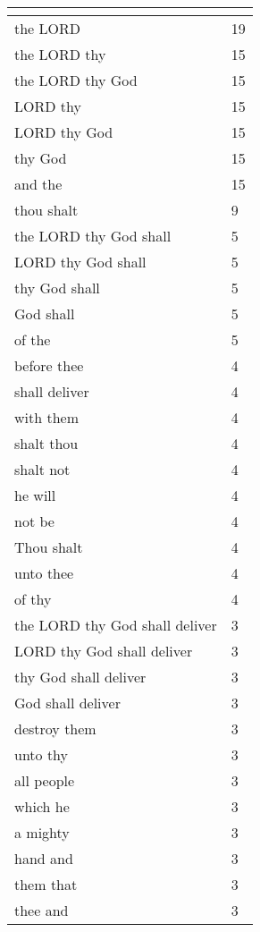 \begin{center}
\begin{longtable}{|p{3.0in}|p{0.5in}|}
\hline \multicolumn{2}{c}{{ }} \\ \hline
\endfoot 
the LORD & 19\\ \hline 
the LORD thy & 15\\ \hline 
the LORD thy God & 15\\ \hline 
LORD thy & 15\\ \hline 
LORD thy God & 15\\ \hline 
thy God & 15\\ \hline 
and the & 15\\ \hline 
thou shalt & 9\\ \hline 
the LORD thy God shall & 5\\ \hline 
LORD thy God shall & 5\\ \hline 
thy God shall & 5\\ \hline 
God shall & 5\\ \hline 
of the & 5\\ \hline 
before thee & 4\\ \hline 
shall deliver & 4\\ \hline 
with them & 4\\ \hline 
shalt thou & 4\\ \hline 
shalt not & 4\\ \hline 
he will & 4\\ \hline 
not be & 4\\ \hline 
Thou shalt & 4\\ \hline 
unto thee & 4\\ \hline 
of thy & 4\\ \hline 
the LORD thy God shall deliver & 3\\ \hline 
LORD thy God shall deliver & 3\\ \hline 
thy God shall deliver & 3\\ \hline 
God shall deliver & 3\\ \hline 
destroy them & 3\\ \hline 
unto thy & 3\\ \hline 
all people & 3\\ \hline 
which he & 3\\ \hline 
a mighty & 3\\ \hline 
hand and & 3\\ \hline 
them that & 3\\ \hline 
thee and & 3\\ \hline 
\end{longtable}
\end{center}





